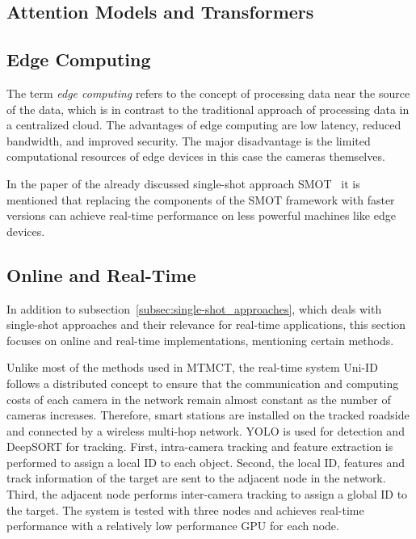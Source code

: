 \subsection{Attention Models and Transformers}\label{subsec:attention_models_and_transformers}

\subsection{Edge Computing}\label{subsec:edge_computing}
The term \textit{edge computing} refers to the concept of processing data near the source of the data, which is in contrast to the traditional approach of processing data in a centralized cloud. The advantages of edge computing are low latency, reduced bandwidth, and improved security. The major disadvantage is the limited computational resources of edge devices in this case the cameras themselves.

In the paper of the already discussed single-shot approach SMOT~\cite{Li20} it is mentioned that replacing the components of the SMOT framework with faster versions can achieve real-time performance on less powerful machines like edge devices.

\subsection{Online and Real-Time}\label{subsec:online_and_real-time}
In addition to subsection~\ref{subsec:single-shot_approaches}, which deals with single-shot approaches and their relevance for real-time applications, this section focuses on online and real-time implementations, mentioning certain methods.

Unlike most of the methods used in MTMCT, the real-time system Uni-ID~\cite{Chen22} follows a distributed concept to ensure that the communication and computing costs of each camera in the network remain almost constant as the number of cameras increases. Therefore, smart stations are installed on the tracked roadside and connected by a wireless multi-hop network. YOLO is used for detection and DeepSORT for tracking. First, intra-camera tracking and feature extraction is performed to assign a local ID to each object. Second, the local ID, features and track information of the target are sent to the adjacent node in the network. Third, the adjacent node performs inter-camera tracking to assign a global ID to the target. The system is tested with three nodes and achieves real-time performance with a relatively low performance GPU for each node.

